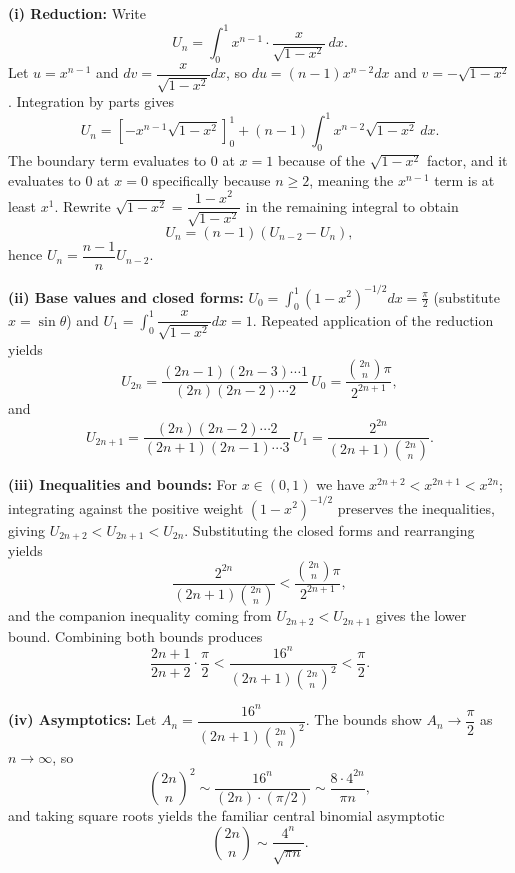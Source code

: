 \begin{solution}
	\textbf{(i) Reduction:} Write
\[U_n=\int_0^1 x^{n-1}\cdot\frac{x}{\sqrt{1-x^2}}\,dx.
\]
Let $u=x^{n-1}$ and $dv=\dfrac{x}{\sqrt{1-x^2}}dx$, so $du=(n-1)x^{n-2}dx$ and $v=-\sqrt{1-x^2}$. Integration by parts gives
\[U_n=\left[-x^{n-1}\sqrt{1-x^2}\right]_0^1+(n-1)\int_0^1 x^{n-2}\sqrt{1-x^2}\,dx.
\]
The boundary term evaluates to $0$ at $x=1$ because of the $\sqrt{1-x^2}$ factor, and it evaluates to $0$ at $x=0$ specifically because $n \ge 2$, meaning the $x^{n-1}$ term is at least $x^1$.
Rewrite $\sqrt{1-x^2}=\dfrac{1-x^2}{\sqrt{1-x^2}}$ in the remaining integral to obtain
\[U_n=(n-1)(U_{n-2}-U_n),\]
hence $U_n=\dfrac{n-1}{n}U_{n-2}$.

	\textbf{(ii) Base values and closed forms:} $U_0=\int_0^1(1-x^2)^{-1/2}dx=\frac{\pi}{2}$ (substitute $x=\sin\theta$) and $U_1=\int_0^1 \dfrac{x}{\sqrt{1-x^2}}dx=1$. Repeated application of the reduction yields
\[U_{2n}=\frac{(2n-1)(2n-3)\cdots1}{(2n)(2n-2)\cdots2}\,U_0=\frac{\binom{2n}{n}\pi}{2^{2n+1}},\]
and
\[U_{2n+1}=\frac{(2n)(2n-2)\cdots2}{(2n+1)(2n-1)\cdots3}\,U_1=\frac{2^{2n}}{(2n+1)\binom{2n}{n}}.
\]

	\textbf{(iii) Inequalities and bounds:} For $x\in(0,1)$ we have $x^{2n+2}<x^{2n+1}<x^{2n}$; integrating against the positive weight $(1-x^2)^{-1/2}$ preserves the inequalities, giving $U_{2n+2}<U_{2n+1}<U_{2n}$. Substituting the closed forms and rearranging yields
\[\frac{2^{2n}}{(2n+1)\binom{2n}{n}}<\frac{\binom{2n}{n}\pi}{2^{2n+1}},\]
and the companion inequality coming from $U_{2n+2}<U_{2n+1}$ gives the lower bound. Combining both bounds produces
\[\frac{2n+1}{2n+2}\cdot\frac{\pi}{2}<\frac{16^n}{(2n+1)\binom{2n}{n}^2}<\frac{\pi}{2}.
\]

	\textbf{(iv) Asymptotics:} Let $A_n=\dfrac{16^n}{(2n+1)\binom{2n}{n}^2}$. The bounds show $A_n\to\dfrac{\pi}{2}$ as $n\to\infty$, so
\[\binom{2n}{n}^2\sim\frac{16^n}{(2n)\cdot(\pi/2)}\sim\frac{8\cdot4^{2n}}{\pi n},\]
and taking square roots yields the familiar central binomial asymptotic
\[\binom{2n}{n}\sim\frac{4^n}{\sqrt{\pi n}}.
\]
\end{solution}

